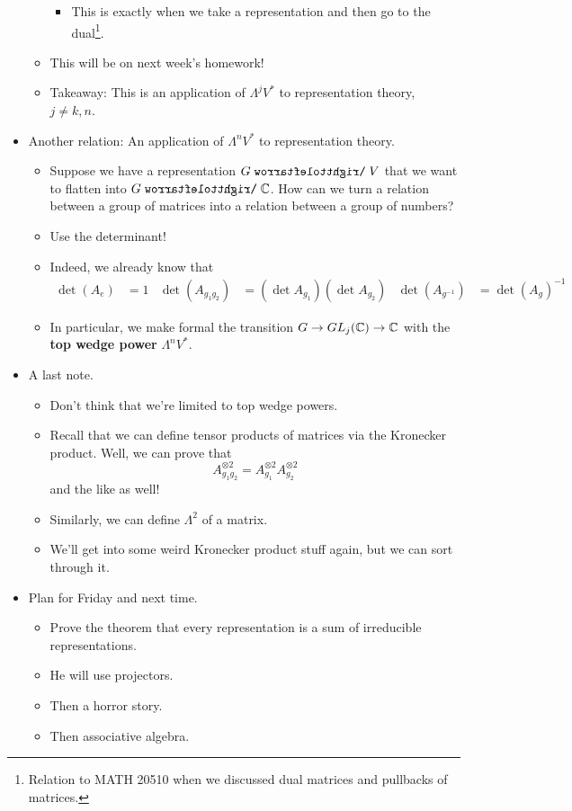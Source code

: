 \documentclass[../notes.tex]{subfiles}
\begin{document}
\begin{itemize}
\begin{itemize}
\begin{itemize}
            \item This is exactly when we take a representation and then go to the dual\footnote{Relation to MATH 20510 when we discussed dual matrices and pullbacks of matrices.}.
        \end{itemize}
        \item This will be on next week's homework!
        \item Takeaway: This is an application of $\Lambda^jV^*$ to representation theory, $j\neq k,n$.
    \end{itemize}
    \item Another relation: An application of $\Lambda^nV^*$ to representation theory.
    \begin{itemize}
        \item Suppose we have a representation $G\acts V$ that we want to flatten into $G\acts\C$. How can we turn a relation between a group of matrices into a relation between a group of numbers?
        \item Use the determinant!
        \item Indeed, we already know that
        \begin{align*}
            \det(A_e) &= 1&
            \det(A_{g_1g_2}) &= (\det A_{g_1})(\det A_{g_2})&
            \det(A_{g^{-1}}) &= \det(A_g)^{-1}
        \end{align*}
        \item In particular, we make formal the transition $G\to GL_j(\mathbb{C})\to\mathbb{C}$ with the \textbf{top wedge power} $\Lambda^nV^*$.
    \end{itemize}
    \item A last note.
    \begin{itemize}
        \item Don't think that we're limited to top wedge powers.
        \item Recall that we can define tensor products of matrices via the Kronecker product. Well, we can prove that
        \begin{equation*}
            A_{g_1g_2}^{\otimes 2} = A_{g_1}^{\otimes 2}A_{g_2}^{\otimes 2}
        \end{equation*}
        and the like as well!
        \item Similarly, we can define $\Lambda^2$ of a matrix.
        \item We'll get into some weird Kronecker product stuff again, but we can sort through it.
    \end{itemize}
    \item Plan for Friday and next time.
    \begin{itemize}
        \item Prove the theorem that every representation is a sum of irreducible representations.
        \item He will use projectors.
        \item Then a horror story.
        \item Then associative algebra.
    \end{itemize}
\end{itemize}
\end{document}
